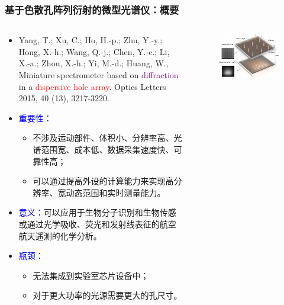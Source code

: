 \begin{frame}[c]
    \frametitle{基于色散孔阵列衍射的微型光谱仪：概要}
    \begin{columns}
        \begin{column}{.6\textwidth}
            \begin{itemize}
                \item Yang, T.;  Xu, C.;  Ho, H.-p.;  Zhu, Y.-y.;  Hong, X.-h.;  Wang, Q.-j.;  Chen, Y.-c.;  Li, X.-a.;  Zhou, X.-h.;  Yi, M.-d.; Huang, W., Miniature spectrometer based on \textcolor{purple}{diffraction} in a \textcolor{red}{dispersive hole array}. Optics Letters 2015, 40 (13), 3217-3220.
                \item \textcolor{blue}{重要性：}\begin{itemize}
                          \item 不涉及运动部件、体积小、分辨率高、光谱范围宽、成本低、数据采集速度快、可靠性高；
                          \item 可以通过提高外设的计算能力来实现高分辨率、宽动态范围和实时测量能力。
                      \end{itemize}
                \item \textcolor{blue}{意义：}可以应用于生物分子识别和生物传感或通过光学吸收、荧光和发射线表征的航空航天遥测的化学分析。
                \item \textcolor{blue}{瓶颈：}\begin{itemize}
                          \item 无法集成到实验室芯片设备中；
                          \item 对于更大功率的光源需要更大的孔尺寸。
                      \end{itemize}
            \end{itemize}
        \end{column}
        \begin{column}{.4\textwidth}
            \begin{figure}[!htb] %
                \centering %
                \includegraphics[width=1.\textwidth]{figures/Miniature spectrometer based on diffraction in a dispersive hole array_1.png} %

\end{figure}
\end{column}
\end{columns}
\end{frame}
